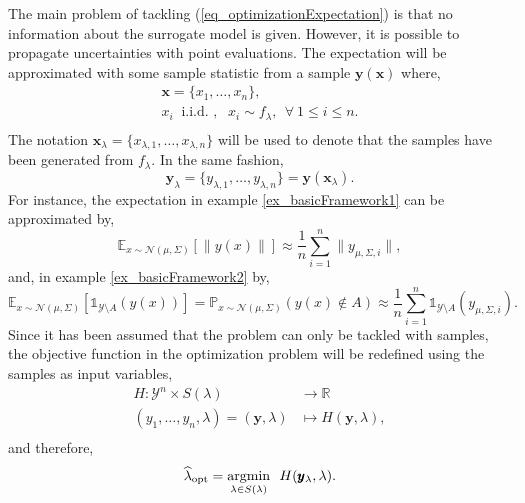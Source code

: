 The main problem of tackling (\ref{eq_optimizationExpectation}) is that no information about the surrogate model is given. 
However, it is possible to propagate uncertainties with point evaluations.
The expectation will be approximated with some sample statistic from a sample $\pmb{y}(\pmb{x})$ where,
$$
  \begin{array}{c}
    \pmb{x} = \{x_1, \dots, x_n\}, \\
    x_i \ \text{ i.i.d. , } \ \ x_i \sim f_{\lambda}, \ \ \forall \ 1\leq i \leq n. \\  
  \end{array}
$$
The notation $\pmb{x}_{\lambda} = \{x_{\lambda,1}, \dots, x_{\lambda,n}\}$ will be used to denote that the samples have been generated from $f_{\lambda}$.
In the same fashion, 
$$
  \pmb{y}_{\lambda} = \{y_{\lambda,1}, \dots, y_{\lambda,n}\} = \pmb{y}(\pmb{x}_{\lambda}).
$$
For instance, the expectation in example \ref{ex_basicFramework1} can be approximated by,
$$
  \mathbb{E}_{x \sim \mathcal{N}(\mu, \Sigma)}\left[ \|y(x)\| \right] \approx 
  \frac{1}{n}\sum_{i=1}^n \|y_{\mu,\Sigma,i}\|,
$$
and, in example \ref{ex_basicFramework2} by,
$$
      \mathbb{E}_{x \sim \mathcal{N}(\mu, \Sigma)}\left[ \mathbb{1}_{\mathcal{Y} \setminus A}(y(x)) \right] = 
      \mathbb{P}_{x \sim \mathcal{N}(\mu, \Sigma)}\left( y(x) \notin  A \right) \approx
      \frac{1}{n}\sum_{i=1}^n \mathbb{1}_{\mathcal{Y} \setminus A}(y_{\mu,\Sigma,i}).
$$
Since it has been assumed that the problem can only be tackled with samples, the objective function in the optimization problem will be redefined using the samples as input variables,
$$
 \begin{aligned}
  H: \mathcal{Y}^n \times S(\lambda) &\to \mathbb{R} \\
     (y_1, \dots, y_n, \lambda) = (\pmb{y}, \lambda) &\mapsto H(\pmb{y}, \lambda), \\
 \end{aligned}
$$
and therefore,
\begin{equation} \label{eq_optimizationObjectiveFunctionH}
  \widehat{\lambda}_{\textup{opt}} = \underset{\lambda\in S(\lambda)}{\textup{argmin}} \ \ H(\pmb{y}_{\lambda}, \lambda).
\end{equation}

